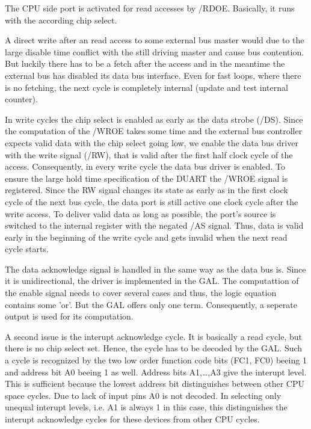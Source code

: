 \documentclass[12pt]{article}
\begin{document}
The CPU side port is activated for read accesses by /RDOE. Basically, 
it runs with the according chip select.

A direct write after an read access to some external bus master would
due to the large disable time conflict with the still driving master
and cause bus contention. But luckily there has to be a fetch after
the access and in the meantime the external bus has disabled its data
bus interface. Even for fast loops, where there is no fetching, the
next cycle is completely internal (update and test internal counter).

In write cycles the chip select is enabled as early as the data strobe
(/DS). Since the computation of the /WROE takes some time and the
external bus controller expects valid data with the chip select going
low, we enable the data bus driver with the write signal (/RW), that
is valid after the first half clock cycle of the access. Consequently,
in every write cycle the data bus driver is enabled. To ensure the
large hold time specification of the DUART the /WROE signal is
registered. Since the RW signal changes its state as early as in the
first clock cycle of the next bus cycle, the data port is still active
one clock cycle after the write access. To deliver valid data as long
as possible, the port's source is switched to the internal register
with the negated /AS signal. Thus, data is valid early in the
beginning of the write cycle and gets invalid when the next read cycle
starts.

The data acknowledge signal is handled in the same way as the data bus is.
Since it is unidirectional, the driver is implemented in the GAL.
The computattion of the enable signal needs to cover several cases and
thus, the logic equation contains some 'or'. But the GAL offers only
one term. Consequently, a seperate output is used for its computation.

A second issue is the interupt acknowledge cycle. It is basically a read
cycle, but there is no chip select set. Hence, the cycle has to be decoded
by the GAL. Such a cycle is recognized by the two low order function code
bits (FC1, FC0) beeing 1 and address bit A0 beeing 1 as well. Address bits
A1,\ldots ,A3 give the interupt level. This is sufficient because the lowest
address bit distinguishes between other CPU space cycles. Due to lack
of input pins A0 is not decoded. In selecting only unequal interupt
levels, i.e. A1 is always 1 in this case, this distinguishes the
interupt acknowledge cycles for these devices from other CPU cycles.
\end{document}
